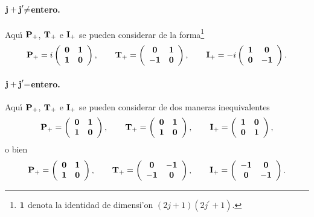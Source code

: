 \paragraph{${\bf j+j}^{\prime }{\bf \neq }$entero.}

Aqu{\'\i} ${\bf P}_{+}$, ${\bf T}_{+}$ e ${\bf I}_{+}$ se pueden considerar
de la forma\footnote{${\bf 1}$ denota la identidad de dimensi'on $\left(
2j+1\right) \left( 2j^{\prime }+1\right) $.} 
\begin{equation}
{\bf P}_{+}=i\left( 
\begin{array}{cc}
{\bf 0} & {\bf 1} \\ 
{\bf 1} & {\bf 0}
\end{array}
\right) ,\qquad {\bf T}_{+}=\left( 
\begin{array}{cc}
{\bf 0} & {\bf 1} \\ 
-{\bf 1} & {\bf 0}
\end{array}
\right) ,\qquad {\bf I}_{+}=-i\left( 
\begin{array}{cc}
{\bf 1} & {\bf 0} \\ 
{\bf 0} & -{\bf 1}
\end{array}
\right) . 
\end{equation}

\paragraph{${\bf j+j}^{\prime }{\bf =}$entero.}

Aqu{\'\i} ${\bf P}_{+}$, ${\bf T}_{+}$ e ${\bf I}_{+}$ se pueden considerar
de dos maneras inequivalentes 
\begin{equation}
{\bf P}_{+}=\left( 
\begin{array}{cc}
{\bf 0} & {\bf 1} \\ 
{\bf 1} & {\bf 0}
\end{array}
\right) ,\qquad {\bf T}_{+}=\left( 
\begin{array}{cc}
{\bf 0} & {\bf 1} \\ 
{\bf 1} & {\bf 0}
\end{array}
\right) ,\qquad {\bf I}_{+}=\left( 
\begin{array}{cc}
{\bf 1} & {\bf 0} \\ 
{\bf 0} & {\bf 1}
\end{array}
\right) , 
\end{equation}
o bien 
\begin{equation}
{\bf P}_{+}=\left( 
\begin{array}{cc}
{\bf 0} & {\bf 1} \\ 
{\bf 1} & {\bf 0}
\end{array}
\right) ,\qquad {\bf T}_{+}=\left( 
\begin{array}{cc}
{\bf 0} & -{\bf 1} \\ 
-{\bf 1} & {\bf 0}
\end{array}
\right) ,\qquad {\bf I}_{+}=\left( 
\begin{array}{cc}
-{\bf 1} & {\bf 0} \\ 
{\bf 0} & -{\bf 1}
\end{array}
\right) . 
\end{equation}

